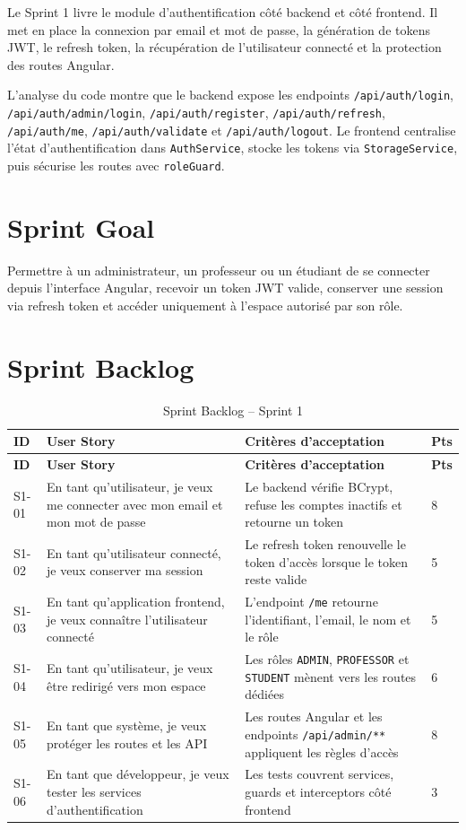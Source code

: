 \documentclass[12pt,a4paper]{report}
\begin{document}
Le Sprint 1 livre le module d'authentification côté backend et côté frontend. Il met en place la connexion par email et mot de passe, la génération de tokens JWT, le refresh token, la récupération de l'utilisateur connecté et la protection des routes Angular.

L'analyse du code montre que le backend expose les endpoints \texttt{/api/auth/login}, \texttt{/api/auth/admin/login}, \texttt{/api/auth/register}, \texttt{/api/auth/refresh}, \texttt{/api/auth/me}, \texttt{/api/auth/validate} et \texttt{/api/auth/logout}. Le frontend centralise l'état d'authentification dans \texttt{AuthService}, stocke les tokens via \texttt{StorageService}, puis sécurise les routes avec \texttt{roleGuard}.

\section{Sprint Goal}

Permettre à un administrateur, un professeur ou un étudiant de se connecter depuis l'interface Angular, recevoir un token JWT valide, conserver une session via refresh token et accéder uniquement à l'espace autorisé par son rôle.

\section{Sprint Backlog}

\begin{longtable}{|p{1.6cm}|p{6cm}|p{5.6cm}|p{1.4cm}|}
\caption{Sprint Backlog -- Sprint 1}\\
\hline
\textbf{ID} & \textbf{User Story} & \textbf{Critères d'acceptation} & \textbf{Pts} \\
\hline
\endfirsthead
\hline
\textbf{ID} & \textbf{User Story} & \textbf{Critères d'acceptation} & \textbf{Pts} \\
\hline
\endhead
S1-01 & En tant qu'utilisateur, je veux me connecter avec mon email et mon mot de passe & Le backend vérifie BCrypt, refuse les comptes inactifs et retourne un token & 8 \\
\hline
S1-02 & En tant qu'utilisateur connecté, je veux conserver ma session & Le refresh token renouvelle le token d'accès lorsque le token reste valide & 5 \\
\hline
S1-03 & En tant qu'application frontend, je veux connaître l'utilisateur connecté & L'endpoint \texttt{/me} retourne l'identifiant, l'email, le nom et le rôle & 5 \\
\hline
S1-04 & En tant qu'utilisateur, je veux être redirigé vers mon espace & Les rôles \texttt{ADMIN}, \texttt{PROFESSOR} et \texttt{STUDENT} mènent vers les routes dédiées & 6 \\
\hline
S1-05 & En tant que système, je veux protéger les routes et les API & Les routes Angular et les endpoints \texttt{/api/admin/**} appliquent les règles d'accès & 8 \\
\hline
S1-06 & En tant que développeur, je veux tester les services d'authentification & Les tests couvrent services, guards et interceptors côté frontend & 3 \\
\hline
\end{longtable}
\end{document}
